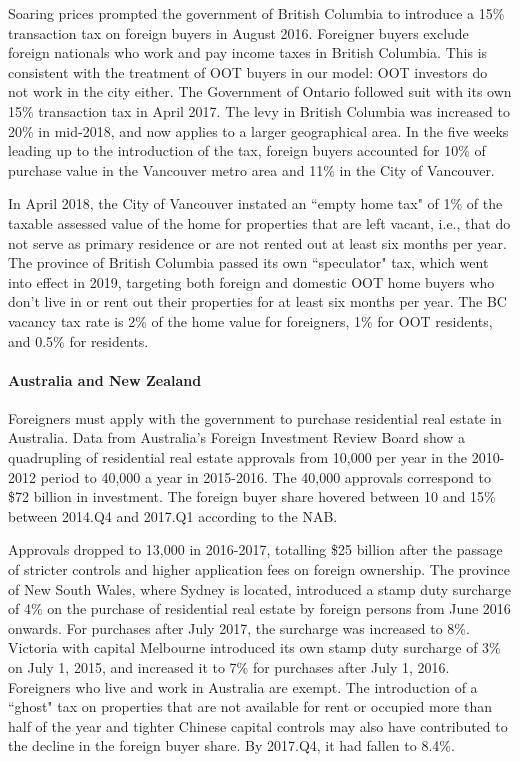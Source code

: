 \documentclass[letterpaper,12pt,dvipsnames,usenames]{article}
\theoremstyle{definition}
\begin{document}
\begin{spacing}{1.25}
Soaring prices prompted the government of British Columbia to introduce a 15\% transaction tax on foreign buyers in August 2016.
Foreigner buyers exclude foreign nationals who work and pay income taxes in British Columbia. This is consistent with the treatment of OOT buyers in our model: OOT investors do not work in the city either. The Government of Ontario  followed suit with its own 15\% transaction tax in April 2017. The levy in British Columbia was increased to 20\% in mid-2018, and now applies to a larger geographical area.
In the five weeks leading up  to the introduction of the tax, foreign buyers accounted for 10\% of purchase value
in the Vancouver metro area and 11\% in the City of Vancouver.

In April 2018, the City of Vancouver  instated an ``empty home tax" of 1\% of the taxable assessed value of the home for properties that are left vacant, i.e., that do not serve as primary residence or are not rented out at least six months per year. The province of British Columbia passed its own ``speculator" tax, which went into effect in 2019, targeting both foreign and domestic OOT home buyers who don't live in or rent out their properties for at least six months per year. The BC vacancy tax rate is 2\% of the home value for foreigners, 1\% for OOT residents, and 0.5\% for residents.

\paragraph{Australia and New Zealand}
Foreigners must apply with the government to purchase residential real estate in Australia. Data from Australia's Foreign Investment Review Board show a quadrupling of residential real estate approvals from 10,000 per year in the 2010-2012 period to 40,000 a year in 2015-2016. The 40,000 approvals correspond to \$72 billion in investment. The foreign buyer share hovered between 10 and 15\% between 2014.Q4 and 2017.Q1 according to the NAB. \

Approvals dropped to 13,000 in 2016-2017, totalling \$25 billion after the passage of stricter controls and higher application fees on foreign ownership.
The  province of New South Wales, where Sydney is located, introduced a stamp duty surcharge of 4\% on the purchase of residential real estate by foreign persons from June 2016 onwards. For purchases after July 2017, the surcharge was increased to 8\%. Victoria with capital Melbourne
introduced its own stamp duty surcharge of 3\% on July 1, 2015, and increased it to 7\% for purchases after July 1, 2016. Foreigners who live and work in Australia are exempt.
The  introduction of a ``ghost" tax on properties that are not available for rent or occupied more than half of the year and tighter Chinese capital controls may also have contributed to the decline in the foreign buyer share.
By 2017.Q4, it had fallen to 8.4\%.




\end{spacing}
\end{document}
